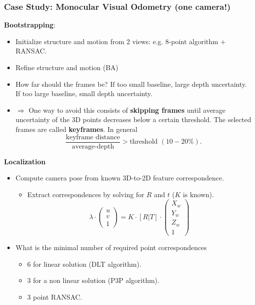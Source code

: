 \documentclass[a4paper,12 pt]{article}
\theoremstyle{definition}
\theoremstyle{remark}
\theoremstyle{definition}
\theoremstyle{definition}
\theoremstyle{definition}
\theoremstyle{remark}
\theoremstyle{definition}
\begin{document}
\subsubsection*{Case Study: Monocular Visual Odometry (one camera!)}
\textbf{Bootstrapping}:
\begin{itemize}
\item Initialize structure and motion from 2 views: e.g. 8-point algorithm + RANSAC.
\item Refine structure and motion (BA)
\item How far should the frames be? If too small baseline, large depth uncertainty. If too large baseline, small depth uncertainty.
\item $\Rightarrow$ One way to avoid this consists of \textbf{skipping frames} until average uncertainty of the 3D points decreases below a certain threshold. The selected frames are called \textbf{keyframes}. In general
\begin{equation}
\frac{\text{keyframe distance}}{\text{average-depth}}>\text{threshold }(10-20\%).
\end{equation}
\end{itemize}
\textbf{Localization}
\begin{itemize}
\item Compute camera pose from known 3D-to-2D feature correspondence. 
\begin{itemize}
\item Extract correspondences by solving for $R$ and $t$ ($K$ is known).
\begin{equation}
 \lambda \cdot \begin{pmatrix}
 u\\
 v\\
 1
 \end{pmatrix}=K\cdot [R|T]\cdot \begin{pmatrix}
 X_w\\
 Y_w\\
 Z_w\\
 1
 \end{pmatrix}
 \end{equation}
\end{itemize}
 \item What is the minimal number of required point correspondences
\begin{itemize}
\item 6 for linear solution (DLT algorithm).
\item 3 for a non linear solution (P3P algorithm).
\item 3 point RANSAC.
\end{itemize}
\end{itemize}
\end{document}

